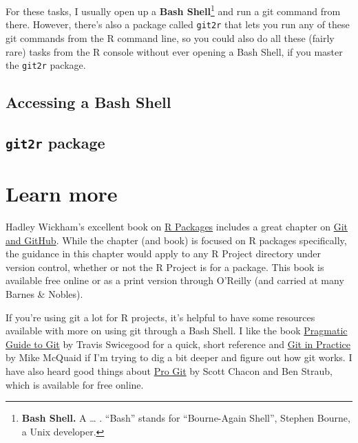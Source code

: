 \documentclass[]{tufte-book}
\begin{document}
For these tasks, I usually open up a \textbf{Bash Shell}\footnote{\textbf{Bash Shell.} A \ldots{} . ``Bash'' stands
  for ``Bourne-Again Shell'', Stephen Bourne, a Unix developer.} and run a git command from
there. However, there's also a package called \texttt{git2r} that lets you run any of these
git commands from the R command line, so you could also do all these (fairly rare) tasks
from the R console without ever opening a Bash Shell, if you master the \texttt{git2r} package.

\hypertarget{accessing-a-bash-shell}{%
\subsection{Accessing a Bash Shell}\label{accessing-a-bash-shell}}

\hypertarget{git2r-package}{%
\subsection{\texorpdfstring{\texttt{git2r} package}{git2r package}}\label{git2r-package}}

\hypertarget{learn-more-1}{%
\section{Learn more}\label{learn-more-1}}

Hadley Wickham's excellent book on \href{http://r-pkgs.had.co.nz/}{R Packages} includes a great
chapter on \href{http://r-pkgs.had.co.nz/git.html}{Git and GitHub}. While the chapter (and book) is
focused on R packages specifically, the guidance in this chapter would apply to any
R Project directory under version control, whether or not the R Project is for a package.
This book is available free online or as a print version through O'Reilly (and
carried at many Barnes \& Nobles).

If you're using git a lot for R projects, it's helpful to have some resources available with
more on using git through a Bash Shell. I like the book \href{https://www.amazon.com/Pragmatic-Guide-Git-Programmers/dp/1934356727/ref=sr_1_28?keywords=git\&qid=1554173700\&s=gateway\&sr=8-28}{Pragmatic Guide to Git} by Travis Swicegood for a quick, short reference and
\href{https://www.amazon.com/Git-Practice-Techniques-Mike-McQuaid/dp/1617291978/ref=sr_1_60?keywords=git\&qid=1554174811\&s=gateway\&sr=8-60}{Git in Practice} by Mike McQuaid if I'm trying to dig a bit deeper
and figure out how git works.
I have also heard good things about \href{https://git-scm.com/book/en/v2}{Pro Git} by Scott Chacon and
Ben Straub, which is available for free online.
\end{document}
